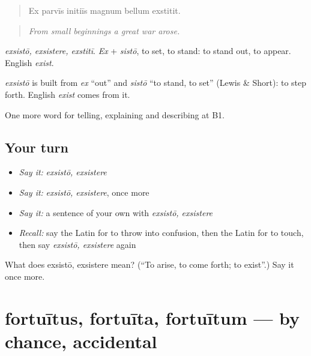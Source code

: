 \begin{quote}
Ex parvīs initiīs magnum bellum exstitit.
\end{quote}

\begin{quote}
\emph{From small beginnings a great war arose.}
\end{quote}

\emph{exsistō, exsistere, exstitī}. \emph{Ex} + \emph{sistō}, to set, to stand: to stand out, to appear. English \emph{exist}.

\begin{cousinweb}
\emph{exsistō} is built from \emph{ex} \textquotedblleft{}out\textquotedblright{} and \emph{sistō} \textquotedblleft{}to stand, to set\textquotedblright{} (Lewis \& Short): to step forth. English \emph{exist} comes from it.
\end{cousinweb}

\begin{grammarlens}[title={What you've built}]
One more word for telling, explaining and describing at B1.
\end{grammarlens}

\subsection*{Your turn}
\begin{itemize}
\raggedright
  \item \emph{Say it:} \emph{exsistō, exsistere}
  \item \emph{Say it:} \emph{exsistō, exsistere}, once more
  \item \emph{Say it:} a sentence of your own with \emph{exsistō, exsistere}
  \item \emph{Recall:} say the Latin for to throw into confusion, then the Latin for to touch, then say \emph{exsistō, exsistere} again
\end{itemize}

\begin{tcolorbox}[breakable,colback=teal!4,colframe=teal!35!black,title={Before you move on}]
What does exsistō, exsistere mean? (\textquotedblleft{}To arise, to come forth; to exist\textquotedblright{}.) Say it once more.
\end{tcolorbox}
\section[fortuītus, fortuīta, fortuītum]{fortuītus, fortuīta, fortuītum — by chance, accidental}

